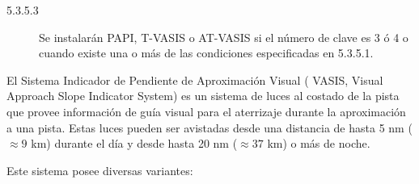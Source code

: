 \begin{tcolorbox}[title=Requerimientos OACI. Anexo 14. Volumen I. Edición 2018.
  5.3.5 Sistemas visuales indicadores de pendiente de aproximación]
{\begin{description}
\item [5.3.5.3] Se instalarán PAPI, T-VASIS o AT-VASIS si el número de clave es 3 ó 4 o cuando existe una o más de las condiciones especificadas en 5.3.5.1.
    \end{description}
}


\end{tcolorbox}


El Sistema Indicador de Pendiente de Aproximación Visual ( VASIS, Visual
Approach Slope Indicator System) es un sistema de luces al costado de la pista que provee información
de guía visual para el aterrizaje durante la aproximación a una pista. Estas luces pueden ser avistadas
desde una distancia de hasta 5 nm ($\approx  9$ km) durante el día y desde hasta 20 nm ($\approx  37$ km) o más
de noche.

Este sistema posee diversas variantes:

